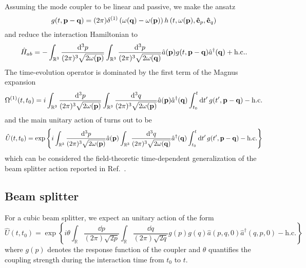 Assuming the mode coupler to be linear and passive, we make the ansatz
\begin{equation}
	g(t,\vb{p}-\vb{q})
	=
	(2\pi)
	\delta^{(1)}\left(\omega(\vb{q})-\omega(\vb{p})\right)
	h\left(t,\omega(\vb{p}),\vu{e}_p,\vu{e}_q\right)
\end{equation}
and reduce the interaction Hamiltonian to
\begin{equation}
	\hat{H}_{ab}
	=
	-
	\int_{\mathbb{R}^3}
	\frac{\dd[3]{p}}{(2\pi)^3\sqrt{2\omega(\vb{p})}}
	\int_{\mathbb{R}^3}
	\frac{\dd[3]{p}}{(2\pi)^3\sqrt{2\omega(\vb{q})}}
	\hat{a}(\vb{p})
	g(t,\vb{p}-\vb{q})
	\hat{a}^\dagger(\vb{q})
	+
	\text{h.c.}
	.
\end{equation}
The time-evolution operator is dominated by the first term of the Magnus expansion
\begin{equation}
	\Omega^{(1)}(t,t_0)
	=
	i
	\int_{\mathbb{R}^3}
	\frac{\dd[3]{p}}{(2\pi)^3\sqrt{2\omega(\vb{p})}}
	\int_{\mathbb{R}^3}
	\frac{\dd[3]{q}}{(2\pi)^3\sqrt{2\omega(\vb{p})}}
	\hat{a}(\vb{p})
	\hat{a}^\dagger(\vb{q})
	\int_{t_0}^t
	\dd{t^\prime}
	g(t^\prime,\vb{p}-\vb{q})
	-
	\text{h.c.}
\end{equation}
and the main unitary action of turns out to be
\begin{equation}
	\hat{U}(t,t_0)
	=
	\exp\left\{
		i
		\int_{\mathbb{R}^3}
		\frac{\dd[3]{p}}{(2\pi)^3\sqrt{2\omega(\vb{p})}}
		\hat{a}(\vb{p})
		\int_{\mathbb{R}^3}
		\frac{\dd[3]{q}}{(2\pi)^3\sqrt{2\omega(\vb{q})}}
		\hat{a}^\dagger(\vb{q})
		\int_{t_0}^t
		\dd{t^\prime}
		g(t^\prime,\vb{p}-\vb{q})
		-
		\text{h.c.}
	\right\}
\end{equation}
which can be considered the field-theoretic time-dependent generalization of the beam splitter action reported in Ref.~\cite{Leonhardt2003,Haroche2006}.

\subsection{Beam splitter}

For a cubic beam splitter, we expect an unitary action of the form
\begin{equation}
	\hat{U}(t,t_0)
	=
	\exp\left\{
		i\theta
		\int_{\mathbb{R}}
		\frac{\dd{p}}{(2\pi)\sqrt{2p}}
		\int_{\mathbb{R}}
		\frac{\dd{q}}{(2\pi)\sqrt{2q}}
		g(p)
		g(q)
		\hat{a}(p,q,0)
		\hat{a}^\dagger(q,p,0)
		-
		\text{h.c.}
	\right\}
\end{equation}
where $g(p)$ denotes the response function of the coupler and $\theta$ quantifies the coupling strength during the interaction time from $t_0$ to $t$.


